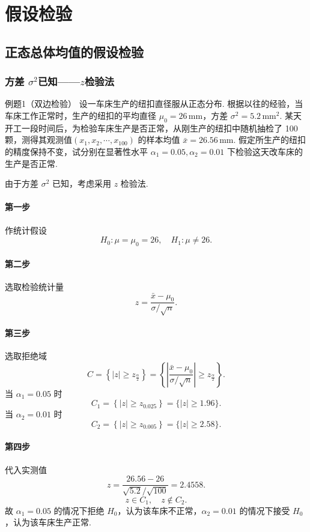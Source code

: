\section{假设检验}


\subsection{正态总体均值的假设检验}


\subsubsection{方差 \texorpdfstring{$\sigma^2$}{σ²}已知——\texorpdfstring{$z$}{z}检验法}

\begin{question}{例题1（双边检验）}
    设一车床生产的纽扣直径服从正态分布. 根据以往的经验，当车床工作正常时，生产的纽扣的平均直径 $\mu_0 = 26 \,\mathrm{mm}$，方差 $\sigma^2 = 5.2 \,\mathrm{mm^2}$. 某天开工一段时间后，为检验车床生产是否正常，从刚生产的纽扣中随机抽检了 100 颗，测得其观测值$(x_1, x_2, \cdots , x_{100})$ 的样本均值 $\bar{x} = 26.56 \,\mathrm{mm}$. 假定所生产的纽扣的精度保持不变，试分别在显著性水平 $\alpha_1 = 0.05, \alpha_2 = 0.01$ 下检验这天改车床的生产是否正常.
\end{question}
\begin{solution}
    由于方差 $\sigma^2$ 已知，考虑采用 $z$ 检验法.
    \paragraph{第一步} 作统计假设
    $$
        H_0: \mu = \mu_0 = 26, \quad H_1: \mu \neq 26.
    $$
    \paragraph{第二步} 选取检验统计量
    $$
        z = \frac{\bar{x}-\mu_0}{\sigma/\sqrt{n}} .
    $$
    \paragraph{第三步} 选取拒绝域
    $$
        C = \left\{ |z| \geqslant z_{\frac{\alpha}{2}}\right\}
        = \left\{\left|\frac{\bar{x}-\mu_0}{\sigma/\sqrt{n}}\right| \geqslant z_{\frac{\alpha}{2}}\right\}.
    $$
    当 $\alpha_1 = 0.05$ 时
    $$
        C_1 = \left\{|z| \geqslant z_{0.025}\right\} = \{|z| \geqslant 1.96\}.
    $$
    当 $\alpha_2 = 0.01$ 时
    $$
        C_2 = \left\{|z| \geqslant z_{0.005}\right\} = \{|z| \geqslant 2.58\}.
    $$
    \paragraph{第四步} 代入实测值
    $$
        z = \frac{26.56-26}{\sqrt{5.2}/\sqrt{100}} = 2.4558.
    $$
    $$
        z \in C_1, \quad z \notin C_2.
    $$
    故 $\alpha_1 = 0.05$ 的情况下拒绝 $H_0$，认为该车床不正常，$\alpha_2 = 0.01$ 的情况下接受 $H_0$，认为该车床生产正常.
\end{solution}



